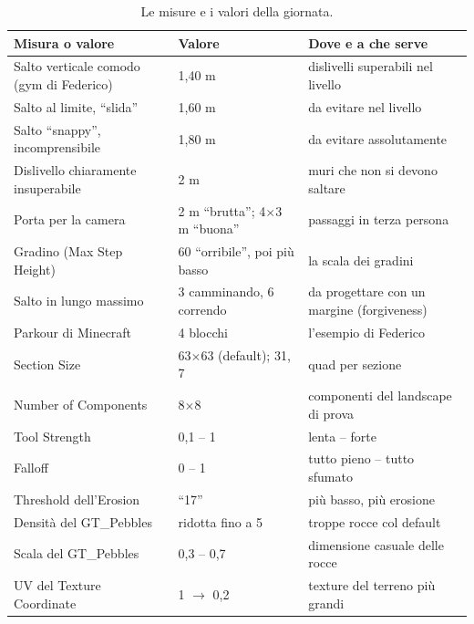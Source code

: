 \begin{table}[htbp]
\centering
\small
\begin{tabular}{@{}p{5.0cm}p{3.0cm}p{6.0cm}@{}}
\toprule
\textbf{Misura o valore} & \textbf{Valore} & \textbf{Dove e a che serve} \\
\midrule
Salto verticale comodo (gym di Federico) & 1,40 m & dislivelli superabili nel livello \\
Salto al limite, ``slida'' & 1,60 m & da evitare nel livello \\
Salto ``snappy'', incomprensibile & 1,80 m & da evitare assolutamente \\
Dislivello chiaramente insuperabile & 2 m & muri che non si devono saltare \\
Porta per la camera & 2 m ``brutta''; 4$\times$3 m ``buona'' & passaggi in terza persona \\
Gradino (Max Step Height) & 60 ``orribile'', poi più basso & la scala dei gradini \\
Salto in lungo massimo & 3 camminando, 6 correndo & da progettare con un margine
(forgiveness) \\
Parkour di Minecraft & 4 blocchi & l'esempio di Federico \\
Section Size & 63$\times$63 (default); 31, 7 & quad per sezione \\
Number of Components & 8$\times$8 & componenti del landscape di prova \\
Tool Strength & 0,1 -- 1 & lenta -- forte \\
Falloff & 0 -- 1 & tutto pieno -- tutto sfumato \\
Threshold dell'Erosion & ``17'' & più basso, più erosione \\
Densità del GT\_Pebbles & ridotta fino a 5 & troppe rocce col default \\
Scala del GT\_Pebbles & 0,3 -- 0,7 & dimensione casuale delle rocce \\
UV del Texture Coordinate & 1 $\to$ 0,2 & texture del terreno più grandi \\
\bottomrule
\end{tabular}
\caption{Le misure e i valori della giornata.}
\label{ue14:tab:misure}
\end{table}

